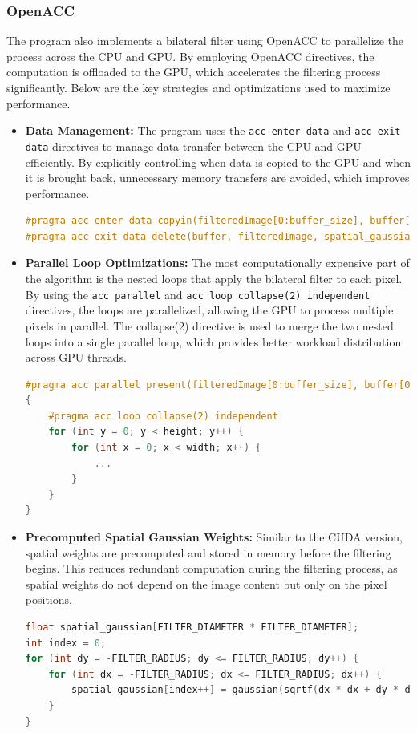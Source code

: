 \documentclass[12pt,a4paper]{report}
\begin{document}
\subsubsection*{OpenACC}
The program also implements a bilateral filter using OpenACC to parallelize the process across the CPU and GPU. By employing OpenACC directives, the computation is offloaded to the GPU, which accelerates the filtering process significantly. Below are the key strategies and optimizations used to maximize performance.

\begin{itemize}
\item \textbf{Data Management:} The program uses the \texttt{acc enter data} and \texttt{acc exit data} directives to manage data transfer between the CPU and GPU efficiently. By explicitly controlling when data is copied to the GPU and when it is brought back, unnecessary memory transfers are avoided, which improves performance.
\begin{lstlisting}[language=c++]
#pragma acc enter data copyin(filteredImage[0:buffer_size], buffer[0:buffer_size], spatial_gaussian[0:FILTER_DIAMETER*FILTER_DIAMETER])
#pragma acc exit data delete(buffer, filteredImage, spatial_gaussian)
\end{lstlisting}

\item \textbf{Parallel Loop Optimizations:} The most computationally expensive part of the algorithm is the nested loops that apply the bilateral filter to each pixel. By using the \texttt{acc parallel} and \texttt{acc loop collapse(2) independent} directives, the loops are parallelized, allowing the GPU to process multiple pixels in parallel. The collapse(2) directive is used to merge the two nested loops into a single parallel loop, which provides better workload distribution across GPU threads.
\begin{lstlisting}[language=c++]
#pragma acc parallel present(filteredImage[0:buffer_size], buffer[0:buffer_size], spatial_gaussian[0:FILTER_DIAMETER*FILTER_DIAMETER]) num_gangs(1024)
{
    #pragma acc loop collapse(2) independent
    for (int y = 0; y < height; y++) {
        for (int x = 0; x < width; x++) {
            ...
        }
    }
}
\end{lstlisting}

\item \textbf{Precomputed Spatial Gaussian Weights:} Similar to the CUDA version, spatial weights are precomputed and stored in memory before the filtering begins. This reduces redundant computation during the filtering process, as spatial weights do not depend on the image content but only on the pixel positions.
\begin{lstlisting}[language=c++]
float spatial_gaussian[FILTER_DIAMETER * FILTER_DIAMETER];
int index = 0;
for (int dy = -FILTER_RADIUS; dy <= FILTER_RADIUS; dy++) {
    for (int dx = -FILTER_RADIUS; dx <= FILTER_RADIUS; dx++) {
        spatial_gaussian[index++] = gaussian(sqrtf(dx * dx + dy * dy), SIGMA_D);
    }
}
\end{lstlisting}


\end{itemize}
\end{document}

